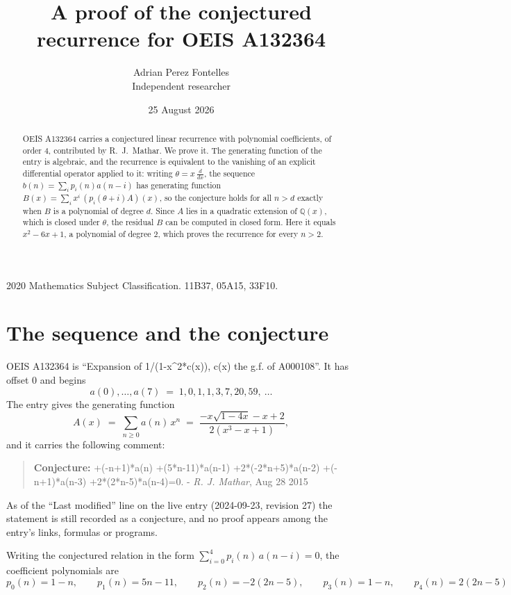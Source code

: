 \documentclass[11pt,a4paper]{article}
\title{A proof of the conjectured recurrence for OEIS A132364}
\author{Adrian Perez Fontelles\\ \small Independent researcher}
\date{25 August 2026}
\theoremstyle{plain}
\theoremstyle{definition}
\begin{document}
\maketitle

\begin{abstract}
OEIS A132364 carries a conjectured linear recurrence with polynomial coefficients, of
order 4, contributed by R.~J.~Mathar. We prove it. The generating function of the
entry is algebraic, and the recurrence is equivalent to the vanishing of an explicit
differential operator applied to it: writing $\theta=x\,\frac{d}{dx}$, the sequence
$b(n)=\sum_{i}p_{i}(n)a(n-i)$ has generating function
$B(x)=\sum_{i}x^{i}\,(p_{i}(\theta+i)A)(x)$, so the conjecture holds for all $n>d$ exactly
when $B$ is a polynomial of degree $d$. Since $A$ lies in a quadratic extension of
$\mathbb{Q}(x)$, which is closed under $\theta$, the residual $B$ can be computed in
closed form. Here it equals $x^{2} - 6 x + 1$, a polynomial of degree $2$, which proves
the recurrence for every $n>2$.
\end{abstract}

\noindent\small 2020 Mathematics Subject Classification. 11B37, 05A15, 33F10.\normalsize

\section{The sequence and the conjecture}

OEIS A132364 is ``Expansion of 1/(1-x\^{}2*c(x)), c(x) the g.f. of A000108''. It has offset $0$ and begins
\[
a(0),\dots,a(7)\;=\;1, 0, 1, 1, 3, 7, 20, 59,\ \dots
\]
The entry gives the generating function
\begin{equation}\label{eq:gf}
A(x)\;=\;\sum_{n\ge 0} a(n)\,x^{n}\;=\;\frac{- x \sqrt{1 - 4 x} - x + 2}{2 \left(x^{3} - x + 1\right)} ,
\end{equation}
and it carries the following comment:
\begin{quote}\small
\textbf{Conjecture:} +(-n+1)*a(n) +(5*n-11)*a(n-1) +2*(-2*n+5)*a(n-2) +(-n+1)*a(n-3) +2*(2*n-5)*a(n-4)=0. - \emph{R. J. Mathar}, Aug 28 2015
\end{quote}
As of the ``Last modified'' line on the live entry (2024-09-23, revision 27) the
statement is still recorded as a conjecture, and no proof appears among the entry's links,
formulas or programs.

Writing the conjectured relation in the form $\sum_{i=0}^{4}p_{i}(n)\,a(n-i)=0$,
the coefficient polynomials are
\[
p_{0}(n)=1 - n,\qquad p_{1}(n)=5 n - 11,\qquad p_{2}(n)=- 2 \left(2 n - 5\right),\qquad p_{3}(n)=1 - n,\qquad p_{4}(n)=2 \left(2 n - 5\right)
\]
\end{document}
